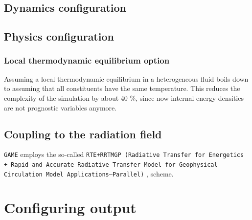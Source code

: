 \documentclass[10pt]{report}
\begin{document}
\section{Dynamics configuration}
\label{sec:dynamics_configuration}

\section{Physics configuration}
\label{sec:physics_configuration}

\subsection{Local thermodynamic equilibrium option}
\label{sec:local_thermodynamic_equilibrium_option}

Assuming a local thermodynamic equilibrium in a heterogeneous fluid boils down to assuming that all constituents have the same temperature. This reduces the complexity of the simulation by about 40 \%, since now internal energy densities are not prognostic variables anymore.

\section{Coupling to the radiation field}
\label{sec:coupling_to_the_radiation_field}

\texttt{GAME} employs the so-called \texttt{RTE+RRTMGP (Radiative Transfer for Energetics + Rapid and Accurate Radiative Transfer Model for Geophysical Circulation Model Applications—Parallel)} \cite{doi:10.1029/2019MS001621}, \cite{rte-rrtmgp-github} scheme.

\chapter{Configuring output}
\label{sec:configuring_output}

\appendix

\printbibliography
\end{document}
